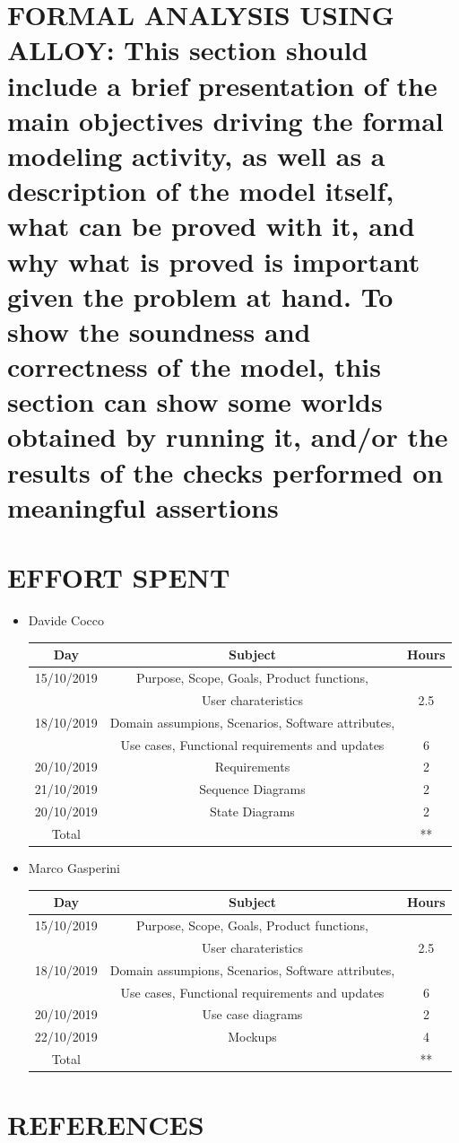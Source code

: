 \documentclass[12pt,a4paper]{article}
\begin{document}
\section{FORMAL	ANALYSIS	USING	ALLOY: This	section	should include	a	brief	presentation	of the	
main	objectives	driving	the	formal	modeling	activity, as	well	as	a	description	of the	model	
itself,	what	can	be	proved with	it, and	why	what	is	proved is	important	given	the	problem	at	
hand. To	show	 the	soundness	and	correctness	of	the model,	 this	section	can	show	some
worlds	obtained	by	running	it,	and/or	the	results	of	the	checks	performed	on	meaningful	
assertions}
\section{EFFORT	SPENT}
\begin{itemize}
\item {Davide Cocco}
 \begin{center}
			\begin{tabular}{| c | c | c |}
				\hline
				Day & Subject & Hours \\ \hline
				15/10/2019 & Purpose, Scope, Goals, Product functions,\\
				&User charateristics & 2.5 \\
				18/10/2019 & Domain assumpions, Scenarios, Software attributes, \\
				& Use cases, Functional requirements and updates  & 6\\
				20/10/2019 & Requirements  & 2\\	
				21/10/2019 & Sequence Diagrams  & 2\\
				20/10/2019 & State Diagrams  & 2\\	
				\hline
				Total & & ** \\
				\hline
			\end{tabular}
		\end{center}
\item {Marco Gasperini}
\begin{center}
			\begin{tabular}{| c | c | c |}
				\hline
				Day & Subject & Hours \\ \hline
				15/10/2019 & Purpose, Scope, Goals, Product functions,\\
				&User charateristics & 2.5 \\
				18/10/2019 & Domain assumpions, Scenarios, Software attributes, \\
				& Use cases, Functional requirements and updates  & 6\\
				20/10/2019 & Use case diagrams & 2\\	
				22/10/2019 & Mockups & 4\\	
				\hline
				Total & & ** \\
				\hline
			\end{tabular}
\end{center}
\end{itemize}
\section{REFERENCES}
\end{document}
